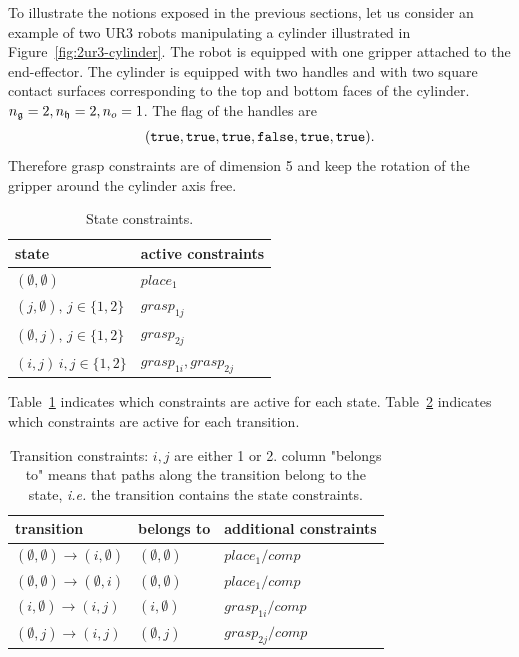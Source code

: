 To illustrate the notions exposed in the previous sections, let us consider an example of two UR3 robots manipulating a cylinder illustrated in Figure~\ref{fig:2ur3-cylinder}. The robot is equipped with one gripper attached to the end-effector. The cylinder is equipped with two handles and with two square contact surfaces corresponding to the top and bottom faces of the cylinder. $n_{\mathfrak{g}}=2,n_{\mathfrak{h}}=2,n_{o}=1$. The flag of the handles are
$$(\texttt{true},\texttt{true},\texttt{true},\texttt{false},\texttt{true},\texttt{true}).$$
Therefore grasp constraints are of dimension 5 and keep the rotation of the gripper around the cylinder axis free.
\begin{table}
  \begin{center}
    \begin{tabular}{|p{.44\linewidth}|p{.44\linewidth}|}
      \hline
      state & active constraints\\
      \hline
      $(\emptyset,\emptyset)$ & $place_1$ \\
      $(j,\emptyset),\,j\in\{1,2\}$ & $grasp_{1j}$\\
      $(\emptyset,j),\,j\in\{1,2\}$ & $grasp_{2j}$\\
      $(i,j)\,i,j\in\{1,2\}$ & $grasp_{1i},grasp_{2j}$\\
      \hline
    \end{tabular}
  \end{center}
  \caption{State constraints.}
  \label{tab:state-constraints}
\end{table}
Table~\ref{tab:state-constraints} indicates which constraints are active for each state. Table~\ref{tab:transition-constraints} indicates which constraints are active for each transition.

\begin{table}
  \begin{center}
    \begin{tabular}{|p{.25\linewidth}|p{.18\linewidth}|p{.41\linewidth}|}
      \hline
      transition & belongs to & additional constraints\\
      \hline
      $(\emptyset,\emptyset)\rightarrow (i,\emptyset)$ & $(\emptyset,\emptyset)$ & $place_1/comp$\\
      $(\emptyset,\emptyset)\rightarrow (\emptyset,i)$ & $(\emptyset,\emptyset)$ & $place_1/comp$\\
      $(i,\emptyset)\rightarrow(i,j)$ & $(i,\emptyset)$ & $grasp_{1i}/comp$\\
      $(\emptyset,j)\rightarrow(i,j)$ & $(\emptyset,j)$ & $grasp_{2j}/comp$\\
      \hline
    \end{tabular}
  \end{center}
  \caption{Transition constraints: $i,j$ are either 1 or 2. column
    "belongs to" means that paths along the transition belong to the
    state, \textit{i.e.} the transition contains the state
    constraints.}
  \label{tab:transition-constraints}
\end{table}

